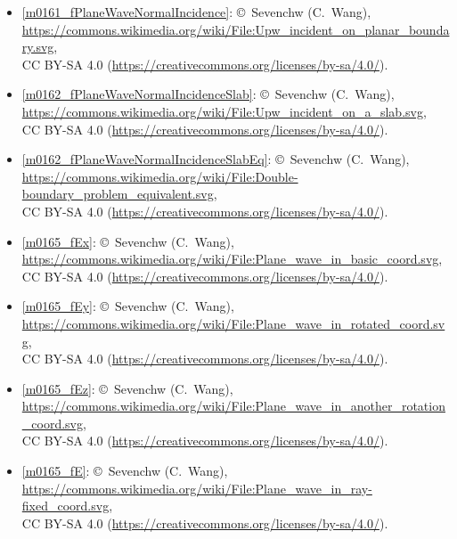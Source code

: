 \begin{itemize}

\item[Fig.] \label{m0161_fPlaneWaveNormalIncidence_Credit}
  \ref{m0161_fPlaneWaveNormalIncidence}:
  \copyright~Sevenchw (C.\ Wang), 
  \url{https://commons.wikimedia.org/wiki/File:Upw_incident_on_planar_boundary.svg},\\ 
  CC BY-SA 4.0 (\url{https://creativecommons.org/licenses/by-sa/4.0/}).

\item[Fig.] \label{m0162_fPlaneWaveNormalIncidenceSlab_Credit}
  \ref{m0162_fPlaneWaveNormalIncidenceSlab}:
  \copyright~Sevenchw (C.\ Wang), 
  \url{https://commons.wikimedia.org/wiki/File:Upw_incident_on_a_slab.svg},\\ 
  CC BY-SA 4.0 (\url{https://creativecommons.org/licenses/by-sa/4.0/}).

\item[Fig.] \label{m0162_fPlaneWaveNormalIncidenceSlabEq_Credit}
  \ref{m0162_fPlaneWaveNormalIncidenceSlabEq}:
  \copyright~Sevenchw (C.\ Wang), 
  \url{https://commons.wikimedia.org/wiki/File:Double-boundary_problem_equivalent.svg},\\ 
  CC BY-SA 4.0 (\url{https://creativecommons.org/licenses/by-sa/4.0/}).

\item[Fig.] \label{m0165_fEx_Credit}
  \ref{m0165_fEx}:
  \copyright~Sevenchw (C.\ Wang), 
  \url{https://commons.wikimedia.org/wiki/File:Plane_wave_in_basic_coord.svg},\\ 
  CC BY-SA 4.0 (\url{https://creativecommons.org/licenses/by-sa/4.0/}).

\item[Fig.] \label{m0165_fEy_Credit}
  \ref{m0165_fEy}:
  \copyright~Sevenchw (C.\ Wang), 
  \url{https://commons.wikimedia.org/wiki/File:Plane_wave_in_rotated_coord.svg},\\ 
  CC BY-SA 4.0 (\url{https://creativecommons.org/licenses/by-sa/4.0/}).

\item[Fig.] \label{m0165_fEz_Credit}
  \ref{m0165_fEz}:
  \copyright~Sevenchw (C.\ Wang), 
  \url{https://commons.wikimedia.org/wiki/File:Plane_wave_in_another_rotation_coord.svg},\\ 
  CC BY-SA 4.0 (\url{https://creativecommons.org/licenses/by-sa/4.0/}).

\item[Fig.] \label{m0165_fE_Credit}
  \ref{m0165_fE}:
  \copyright~Sevenchw (C.\ Wang), 
  \url{https://commons.wikimedia.org/wiki/File:Plane_wave_in_ray-fixed_coord.svg},\\ 
  CC BY-SA 4.0 (\url{https://creativecommons.org/licenses/by-sa/4.0/}).


\end{itemize}

